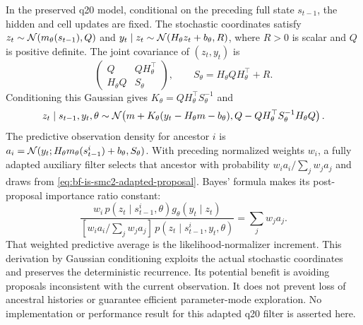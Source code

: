 In the preserved q20 model, conditional on the preceding full state
$s_{t-1}$, the hidden and cell updates are fixed. The stochastic coordinates
satisfy $z_t\sim\mathcal{N}(m_\theta(s_{t-1}),Q)$ and
$y_t\mid z_t\sim\mathcal{N}(H_\theta z_t+b_\theta,R)$, where $R>0$ is scalar
and $Q$ is positive definite. The joint covariance of $(z_t,y_t)$ is
\begin{equation}
 \begin{pmatrix}Q&QH_\theta^\top\\H_\theta Q&S_\theta\end{pmatrix},
 \qquad S_\theta=H_\theta QH_\theta^\top+R.
 \label{eq:bf-is-smc2-adapted-joint-cov}
\end{equation}
Conditioning this Gaussian gives $K_\theta=QH_\theta^\top S_\theta^{-1}$
and
\begin{equation}
 z_t\mid s_{t-1},y_t,\theta\sim
 \mathcal{N}\!\left(m+K_\theta(y_t-H_\theta m-b_\theta),
             Q-QH_\theta^\top S_\theta^{-1}H_\theta Q\right).
 \label{eq:bf-is-smc2-adapted-proposal}
\end{equation}
The predictive observation density for ancestor $i$ is
$a_i=\mathcal{N}(y_t;H_\theta m_\theta(s_{t-1}^i)+b_\theta,S_\theta)$.
With preceding normalized weights $w_i$, a fully adapted auxiliary filter
selects that ancestor with probability $w_i a_i/\sum_jw_j a_j$ and draws
from \eqref{eq:bf-is-smc2-adapted-proposal}. Bayes' formula makes its
post-proposal importance ratio constant:
\begin{equation}
 \frac{w_i\,p(z_t\mid s_{t-1}^i,\theta)
                    g_\theta(y_t\mid z_t)}
      {[w_i a_i/\sum_jw_j a_j]\,
                    p(z_t\mid s_{t-1}^i,y_t,\theta)}
 =\sum_jw_j a_j.
 \label{eq:bf-is-smc2-adapted-weight}
\end{equation}
That weighted predictive average is the likelihood-normalizer increment.
This derivation by Gaussian conditioning exploits the actual stochastic
coordinates and preserves the deterministic recurrence. Its potential
benefit is avoiding proposals inconsistent with the current observation.
It does not prevent loss of ancestral histories or guarantee efficient
parameter-mode exploration. No implementation or performance result for
this adapted q20 filter is asserted here.
